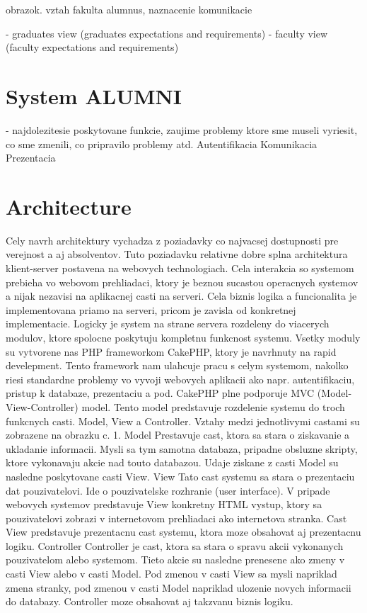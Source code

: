 \documentclass{iitsrc}[2006/14/02]
\begin{document}
obrazok. vztah fakulta alumnus, naznacenie komunikacie

- graduates view (graduates expectations and requirements)
- faculty view (faculty expectations and requirements)

\section{System ALUMNI}

- najdolezitesie poskytovane funkcie, zaujime problemy ktore sme museli vyriesit, co sme zmenili, co pripravilo problemy atd.
Autentifikacia
Komunikacia
Prezentacia

\section{Architecture}
Cely navrh architektury vychadza z poziadavky co najvacsej dostupnosti pre verejnost a aj absolventov. Tuto poziadavku relativne dobre splna architektura klient-server postavena na webovych technologiach. Cela interakcia so systemom prebieha vo webovom prehliadaci, ktory je beznou sucastou operacnych systemov a nijak nezavisi na aplikacnej casti na serveri. Cela biznis logika a funcionalita je implementovana priamo na serveri, pricom je zavisla od konkretnej implementacie. 
Logicky je system na strane servera rozdeleny do viacerych modulov, ktore spolocne poskytuju kompletnu funkcnost systemu. Vsetky moduly su vytvorene nas PHP frameworkom CakePHP, ktory je navrhnuty na rapid develepment. Tento  framework nam ulahcuje pracu s celym systemom, nakolko riesi standardne problemy vo vyvoji webovych aplikacii ako napr. autentifikaciu, pristup k databaze,  prezentaciu a pod.
CakePHP plne podporuje MVC (Model-View-Controller) model. Tento model 
predstavuje rozdelenie systemu do troch funkcnych casti. Model, View a Controller. Vztahy medzi jednotlivymi castami su zobrazene na obrazku c. 1.
Model
Prestavuje cast, ktora sa stara o ziskavanie a ukladanie informacii. Mysli sa tym samotna databaza, pripadne obsluzne skripty, ktore vykonavaju akcie nad touto databazou. Udaje ziskane z casti Model su nasledne poskytovane casti View.
View
Tato cast systemu sa stara o prezentaciu dat pouzivatelovi. Ide o pouzivatelske rozhranie (user interface). V pripade webovych systemov predstavuje View konkretny HTML vystup, ktory sa pouzivatelovi zobrazi v internetovom prehliadaci ako internetova stranka. Cast View predstavuje prezentacnu cast systemu, ktora moze obsahovat aj prezentacnu logiku.
Controller
Controller je cast, ktora sa stara o spravu akcii vykonanych pouzivatelom alebo systemom. Tieto akcie su nasledne prenesene ako zmeny v casti View alebo v casti Model. Pod zmenou v casti View sa mysli napriklad zmena stranky, pod zmenou v casti Model napriklad ulozenie novych informacii do databazy. Controller moze obsahovat aj takzvanu biznis logiku. 
\end{document}
